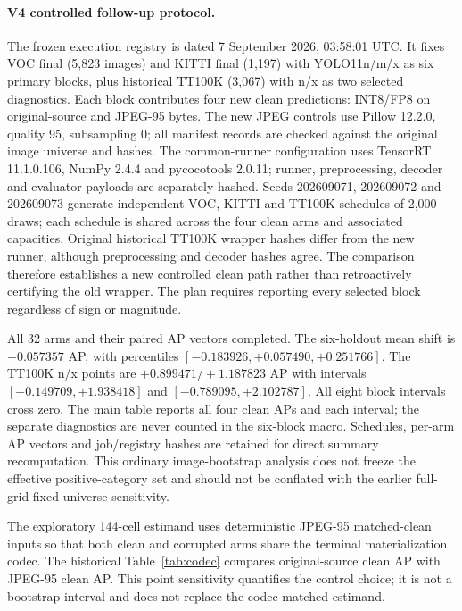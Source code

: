 \documentclass[10pt]{article}
\begin{document}
\paragraph{V4 controlled follow-up protocol.}
The frozen execution registry is dated 7 September 2026, 03:58:01 UTC. It fixes
VOC final (5,823 images) and KITTI final (1,197) with YOLO11n/m/x as six primary
blocks, plus historical TT100K (3,067) with n/x as two selected diagnostics.
Each block contributes four new clean predictions: INT8/FP8 on original-source
and JPEG-95 bytes. The new JPEG controls use Pillow 12.2.0, quality 95,
subsampling 0; all manifest records are checked against the original image
universe and hashes. The common-runner configuration uses TensorRT 11.1.0.106,
NumPy 2.4.4 and pycocotools 2.0.11; runner, preprocessing, decoder and evaluator
payloads are separately hashed. Seeds 202609071, 202609072 and 202609073 generate
independent VOC, KITTI and TT100K schedules of 2,000 draws; each schedule is shared
across the four clean arms and associated capacities. Original historical
TT100K wrapper hashes differ from the new runner, although preprocessing and
decoder hashes agree. The comparison therefore establishes a new controlled
clean path rather than retroactively certifying the old wrapper. The plan
requires reporting every selected block regardless of sign or magnitude.

All 32 arms and their paired AP vectors completed. The six-holdout mean
shift is $+0.057357$ AP, with percentiles $[-0.183926,+0.057490,+0.251766]$.
The TT100K n/x points are $+0.899471/+1.187823$ AP with intervals
$[-0.149709,+1.938418]$ and $[-0.789095,+2.102787]$. All eight block intervals
cross zero. The main table reports all four clean APs and each interval;
the separate diagnostics are never counted in the six-block macro. Schedules,
per-arm AP vectors and job/registry hashes are retained for direct summary
recomputation. This ordinary image-bootstrap analysis does not freeze the
effective positive-category set and should not be conflated with the earlier
full-grid fixed-universe sensitivity.

The exploratory 144-cell estimand uses deterministic JPEG-95 matched-clean inputs so that
both clean and corrupted arms share the terminal materialization codec.
The historical Table~\ref{tab:codec} compares original-source clean AP with JPEG-95 clean AP.
This point sensitivity quantifies the control choice; it is not a bootstrap
interval and does not replace the codec-matched estimand.

\begin{table}[htbp]
\centering
\caption{Original-source clean versus deterministic JPEG-95 clean AP. The last
column is JPEG-95 minus original-source AP, all on the 0--100 AP-point scale.}
\label{tab:codec}
\scriptsize
\resizebox{\textwidth}{!}{}
\end{table}
\end{document}
